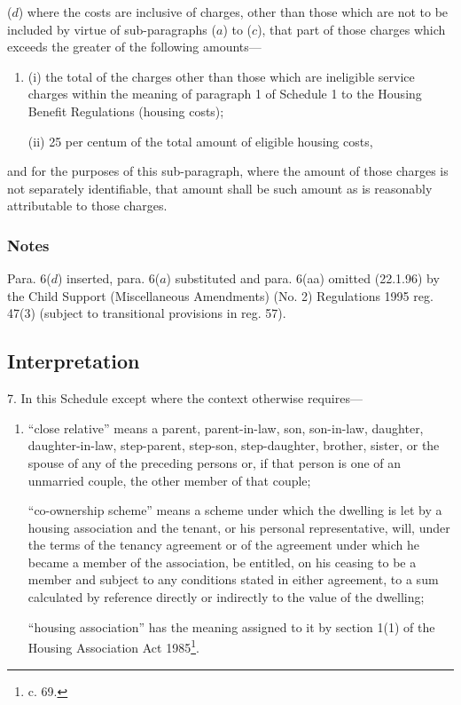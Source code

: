 \documentclass[a4paper]{article}
\newcommand\amendment[1]{\subsubsection*{Notes}{\itshape\frenchspacing\footnotesize #1 \par\goodbreak}}
\begin{document}
\begin{enumerate}
($d$) where the costs are inclusive of charges, other than those which are not to be included by virtue of sub-paragraphs ($a$) to ($c$), that part of those charges which exceeds the greater of the following amounts—
\begin{enumerate}\item[]
(i) the total of the charges other than those which are ineligible service charges within the meaning of paragraph 1 of Schedule 1 to the Housing Benefit Regulations (housing costs);

(ii) 25 per centum of the total amount of eligible housing costs,
\end{enumerate}
and for the purposes of this sub-paragraph, where the amount of those charges is not separately identifiable, that amount shall be such amount as is reasonably attributable to those charges.
\end{enumerate}

\amendment{

Para. 6($d$) inserted, para. 6($a$) substituted and para. 6(aa) omitted (22.1.96) by the Child Support (Miscellaneous Amendments) (No. 2) Regulations 1995 reg. 47(3) (subject to transitional provisions in reg. 57).
}

\subsection*{Interpretation}

7.  In this Schedule except where the context otherwise requires—
\begin{enumerate}\item[]
“close relative” means a parent, parent-in-law, son, son-in-law, daughter, daughter-in-law, step-parent, step-son, step-daughter, brother, sister, or the spouse of any of the preceding persons or, if that person is one of an unmarried couple, the other member of that couple;

“co-ownership scheme” means a scheme under which the dwelling is let by a housing association and the tenant, or his personal representative, will, under the terms of the tenancy agreement or of the agreement under which he became a member of the association, be entitled, on his ceasing to be a member and subject to any conditions stated in either agreement, to a sum calculated by reference directly or indirectly to the value of the dwelling;

“housing association” has the meaning assigned to it by section 1(1) of the Housing Association Act 1985\footnote{ c. 69.}.
\end{enumerate}
\end{document}
